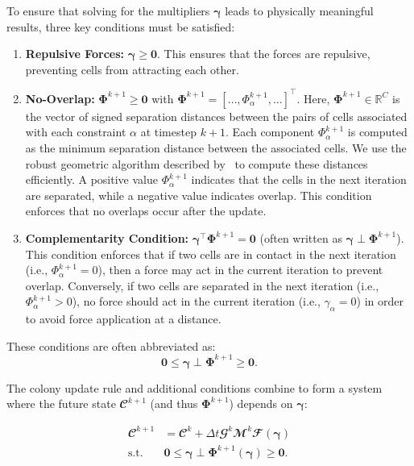 \documentclass[conference]{IEEEtran}
\begin{document}
To ensure that solving for the multipliers $\boldsymbol{\gamma}$ leads to physically meaningful results, three key conditions must be satisfied:


\begin{enumerate}
    \item \textbf{Repulsive Forces:} $\boldsymbol{\gamma} \geq \mathbf{0}$. This ensures that the forces are repulsive, preventing cells from attracting each other.
    \item \textbf{No-Overlap:} $\mathbf{\Phi}^{k+1} \geq \mathbf{0}$ with $\mathbf{\Phi}^{k+1} = [\dots, \Phi_\alpha^{k+1}, \dots]^\top$. Here, $\mathbf{\Phi}^{k+1} \in \mathbb{R}^{C}$ is the vector of signed separation distances between the pairs of cells associated with each constraint $\alpha$ at timestep $k+1$. Each component $\Phi_\alpha^{k+1}$ is computed as the minimum separation distance between the associated cells. We use the robust geometric algorithm described by~\cite{Yan2019, GeometricTools} to compute these distances efficiently.
          A positive value $\Phi_\alpha^{k+1}$ indicates that the cells in the next iteration are separated, while a negative value indicates overlap. This condition enforces that no overlaps occur after the update.
    \item \textbf{Complementarity Condition:}  $\boldsymbol{\gamma}^\top \mathbf{\Phi}^{k+1} = \mathbf{0}$ (often written as $\boldsymbol{\gamma} \perp \mathbf{\Phi}^{k+1}$). This condition enforces that if two cells are in contact in the next iteration (i.e., $\Phi_\alpha^{k+1} = 0$), then a force may act in the current iteration to prevent overlap.
          Conversely, if two cells are separated in the next iteration (i.e., $\Phi_\alpha^{k+1} > 0$), no force should act in the current iteration (i.e., $\gamma_\alpha = 0$) in order to avoid force application at a distance.
\end{enumerate}

These conditions are often abbreviated as:
\begin{equation}
    \mathbf{0} \leq \boldsymbol{\gamma} \perp \mathbf{\Phi}^{k+1} \geq \mathbf{0}.
\end{equation}


The colony update rule and additional conditions combine to form a system where the future state $\mathbfcal{C}^{k+1}$ (and thus $\mathbf{\Phi}^{k+1}$) depends on $\boldsymbol{\gamma}$:

\begin{equation} \label{eq:colony_update_with_constraints}
    \begin{split}
        \mathbfcal{C}^{k+1} & = \mathbfcal{C}^k + \Delta t \mathbfcal{G}^k \mathbfcal{M}^k \mathbfcal{F}(\boldsymbol{\gamma}) \\
        \text{s.t.} \quad & \mathbf{0} \leq \boldsymbol{\gamma} \perp \mathbf{\Phi}^{k+1}(\boldsymbol{\gamma}) \geq \mathbf{0}.
    \end{split}
\end{equation}
\end{document}
